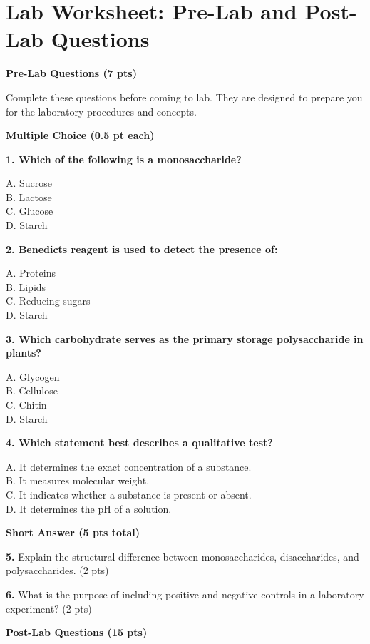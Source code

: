 \documentclass[
  letterpaper,
  DIV=11,
  numbers=noendperiod]{scrreprt}
\begin{document}
\section{\texorpdfstring{\textbf{Lab Worksheet: Pre-Lab and Post-Lab
Questions}}{Lab Worksheet: Pre-Lab and Post-Lab Questions}}\label{lab-worksheet-pre-lab-and-post-lab-questions}

\textbf{Pre-Lab Questions (7 pts)}

Complete these questions before coming to lab. They are designed to
prepare you for the laboratory procedures and concepts.

\textbf{Multiple Choice (0.5 pt each)}

\textbf{1. Which of the following is a monosaccharide?}

A. Sucrose\\
B. Lactose\\
C. Glucose\\
D. Starch

\textbf{2. Benedict\textquotesingle s reagent is used to detect the
presence of:}

A. Proteins\\
B. Lipids\\
C. Reducing sugars\\
D. Starch

\textbf{3. Which carbohydrate serves as the primary storage
polysaccharide in plants?}

A. Glycogen\\
B. Cellulose\\
C. Chitin\\
D. Starch

\textbf{4. Which statement best describes a qualitative test?}

A. It determines the exact concentration of a substance.\\
B. It measures molecular weight.\\
C. It indicates whether a substance is present or absent.\\
D. It determines the pH of a solution.

\textbf{Short Answer (5 pts total)}

\textbf{5.} Explain the structural difference between monosaccharides,
disaccharides, and polysaccharides. (2 pts)

\textbf{6.} What is the purpose of including positive and negative
controls in a laboratory experiment? (2 pts)

\textbf{Post-Lab Questions (15 pts)}
\end{document}
